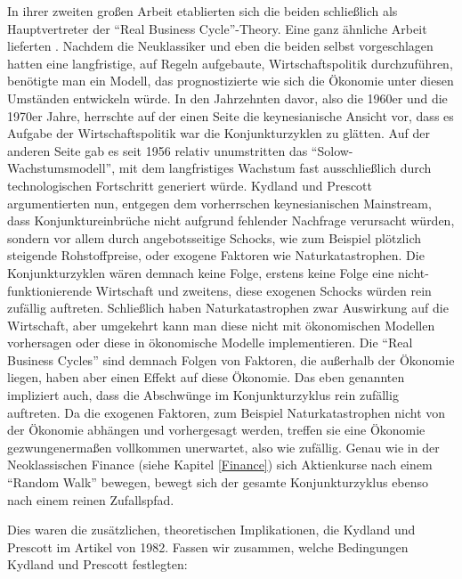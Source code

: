 In ihrer zweiten großen Arbeit \parencite{Kydland1982} etablierten sich die beiden schließlich als Hauptvertreter der "`Real Business Cycle"'-Theory. Eine ganz ähnliche Arbeit lieferten \textcite{Plosser1983}. Nachdem die Neuklassiker und eben die beiden selbst \parencite{Kydland1977} vorgeschlagen hatten eine langfristige, auf Regeln aufgebaute, Wirtschaftspolitik durchzuführen, benötigte man ein Modell, das prognostizierte wie sich die Ökonomie unter diesen Umständen entwickeln würde. In den Jahrzehnten davor, also die 1960er und die 1970er Jahre, herrschte auf der einen Seite die keynesianische Ansicht vor, dass es Aufgabe der Wirtschaftspolitik war die Konjunkturzyklen zu glätten. Auf der anderen Seite gab es seit 1956 relativ unumstritten das "`Solow-Wachstumsmodell"', mit dem langfristiges Wachstum fast ausschließlich durch technologischen Fortschritt generiert würde.
Kydland und Prescott argumentierten nun, entgegen dem vorherrschen keynesianischen Mainstream, dass Konjunktureinbrüche nicht aufgrund fehlender Nachfrage verursacht würden, sondern vor allem durch angebotsseitige Schocks, wie zum Beispiel plötzlich steigende Rohstoffpreise, oder exogene Faktoren wie Naturkatastrophen. Die Konjunkturzyklen wären demnach keine Folge, erstens keine Folge eine nicht-funktionierende Wirtschaft und zweitens, diese exogenen Schocks würden rein zufällig auftreten. Schließlich haben Naturkatastrophen zwar Auswirkung auf die Wirtschaft, aber umgekehrt kann man diese nicht mit ökonomischen Modellen vorhersagen oder diese in ökonomische Modelle implementieren. Die "`Real Business Cycles"' sind demnach Folgen von Faktoren, die außerhalb der Ökonomie liegen, haben aber einen Effekt auf diese Ökonomie. Das eben genannten impliziert auch, dass die Abschwünge im Konjunkturzyklus rein zufällig auftreten. Da die exogenen Faktoren, zum Beispiel Naturkatastrophen nicht von der Ökonomie abhängen und vorhergesagt werden, treffen sie eine Ökonomie gezwungenermaßen vollkommen unerwartet, also wie zufällig. Genau wie in der Neoklassischen Finance (siehe Kapitel \ref{Finance}) sich Aktienkurse nach einem "`Random Walk"' bewegen, bewegt sich der gesamte Konjunkturzyklus ebenso nach einem reinen Zufallspfad.

Dies waren die zusätzlichen, theoretischen Implikationen, die Kydland und Prescott im Artikel von 1982. Fassen wir zusammen, welche Bedingungen Kydland und Prescott festlegten:


